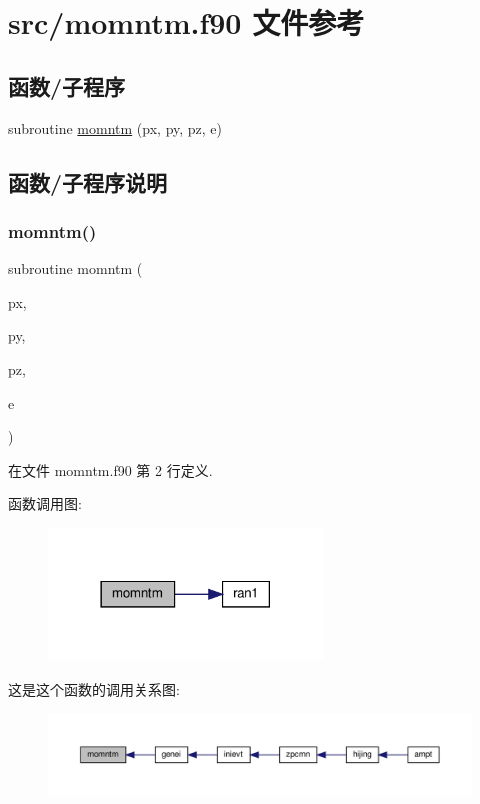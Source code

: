\hypertarget{momntm_8f90}{}\section{src/momntm.f90 文件参考}
\label{momntm_8f90}
\subsection*{函数/子程序}
\begin{DoxyCompactItemize}
\item 
subroutine \mbox{\hyperlink{momntm_8f90_a06a2c00f35bc7098b9916f36d1fba2a3}{momntm}} (px, py, pz, e)
\end{DoxyCompactItemize}


\subsection{函数/子程序说明}
\mbox{\label{momntm_8f90_a06a2c00f35bc7098b9916f36d1fba2a3}} 
\subsubsection{\texorpdfstring{momntm()}{momntm()}}
{\footnotesize\ttfamily subroutine momntm (\begin{DoxyParamCaption}\item[{}]{px,  }\item[{}]{py,  }\item[{}]{pz,  }\item[{}]{e }\end{DoxyParamCaption})}



在文件 momntm.\+f90 第 2 行定义.

函数调用图\+:
\nopagebreak
\begin{figure}[H]
\begin{center}
\leavevmode
\includegraphics[width=206pt]{momntm_8f90_a06a2c00f35bc7098b9916f36d1fba2a3_cgraph}
\end{center}
\end{figure}
这是这个函数的调用关系图\+:
\nopagebreak
\begin{figure}[H]
\begin{center}
\leavevmode
\includegraphics[width=350pt]{momntm_8f90_a06a2c00f35bc7098b9916f36d1fba2a3_icgraph}
\end{center}
\end{figure}
